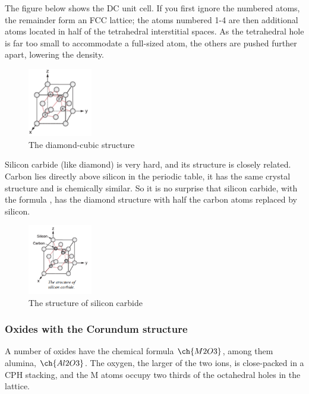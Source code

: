 \documentclass{article}
\begin{document}
The figure below shows the DC unit cell. If you first ignore the numbered atoms, the remainder form an FCC lattice; the atoms numbered 1-4 are then additional atoms located in half of the tetrahedral interstitial spaces. As the tetrahedral hole is far too small to accommodate a full-sized atom, the others are pushed further apart, lowering the density.

\begin{figure}[h]
    \centering
    \includegraphics[width = 0.25\textwidth]{images/mat9.png}
    \caption{The diamond-cubic structure}
    \label{fig:enter-label}
\end{figure}

Silicon carbide (like diamond) is very hard, and its structure is closely related. Carbon lies directly above silicon in the periodic table, it has the same crystal structure and is chemically similar. So it is no surprise that silicon carbide, with the formula , has the diamond structure with half the carbon atoms replaced by silicon. 

\begin{figure}[h]
    \centering
    \includegraphics[width = 0.25\textwidth]{images/mat10.png}
    \caption{The structure of silicon carbide}
    \label{fig:enter-label}
\end{figure}

\subsubsection{Oxides with the Corundum structure}

A number of oxides have the chemical formula $\ch{M2O3}$, among them alumina, $\ch{Al2O3}$. The oxygen, the larger of the two ions, is close-packed in a CPH stacking, and the M atoms occupy two thirds of the octahedral holes in the lattice.
\end{document}
